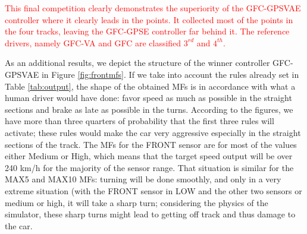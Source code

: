 \documentclass[10pt,journal,compsoc]{IEEEtran}
\begin{document}
\begin{table}[ht]
{{\begin{tabular}{|c|c|c|c|c||c|}
\end{tabular}
}\label{tab:allsresults}
}
\end{table}




\textcolor{red}{
This final competition clearly demonstrates the superiority of the {\sf GFC-GPSVAE} controller where it clearly leads in the points. It collected most of the points in the four tracks, leaving the {\sf GFC-GPSE} controller far behind it. The reference drivers, namely {\sf GFC-VA} and {\sf GFC}  are classified $3^{rd}$ and $4^{th}$.
}


As an additional results, we depict the structure of the winner controller {\sf GFC-GPSVAE} in Figure \ref{fig:frontmfs}. 
If we take into account the rules already set in Table
\ref{tab:output}, the shape of the obtained MFs  is in accordance with
what a human driver would have done: favor speed as much as possible
in the straight sections and brake as late as possible in the turns. 
According to the figures, we have more than three quarters of
probability that the first three rules will activate; these rules
would make the car very aggressive especially in the straight sections
of the track. The MFs for the FRONT sensor are for most of the values
either Medium or High, which means that the target speed output will
be over 240 km/h for the majority of the sensor range. 
That situation is similar for the MAX5 and MAX10 MFs: turning will be done smoothly, and only in a very extreme situation (with the FRONT sensor in LOW and
the other two sensors or medium or high, it will take a sharp turn;
considering the physics of the simulator, these sharp turns might lead
to getting off track and thus damage to the car.
\end{document}
